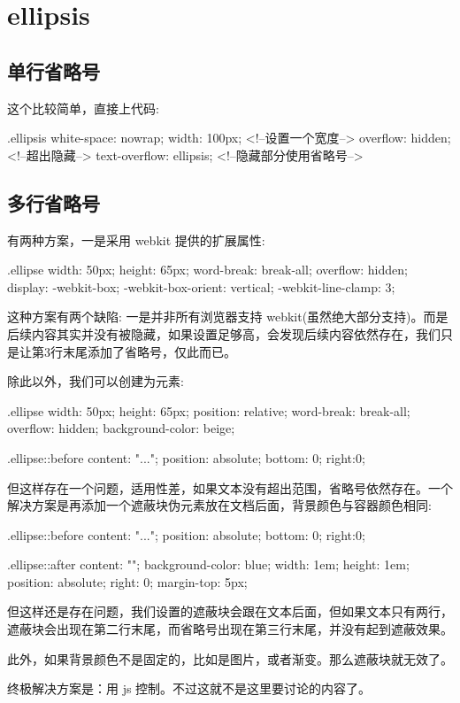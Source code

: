 \section{ellipsis}

\subsection{单行省略号}

这个比较简单，直接上代码:

\begin{HTML}
.ellipsis {
  white-space: nowrap;
  width: 100px;       <!--设置一个宽度-->
  overflow: hidden;   <!--超出隐藏-->
  text-overflow: ellipsis;  <!--隐藏部分使用省略号-->
}
\end{HTML}

\subsection{多行省略号}

有两种方案，一是采用 webkit 提供的扩展属性:

\begin{HTML}
.ellipse {
  width: 50px;
  height: 65px;
  word-break: break-all;
  overflow: hidden;
  display: -webkit-box;
  -webkit-box-orient: vertical;
  -webkit-line-clamp: 3;
}
\end{HTML}

这种方案有两个缺陷: 一是并非所有浏览器支持 webkit(虽然绝大部分支持)。而是后续内容其实并没有被隐藏，如果设置足够高，会发现后续内容依然存在，我们只是让第3行末尾添加了省略号，仅此而已。

除此以外，我们可以创建为元素:

\begin{HTML}
.ellipse {
  width: 50px;
  height: 65px;
  position: relative;
  word-break: break-all;
  overflow: hidden;
  background-color: beige;
}

.ellipse::before {
  content: "...";
  position: absolute;
  bottom: 0;
  right:0;
}
\end{HTML}

但这样存在一个问题，适用性差，如果文本没有超出范围，省略号依然存在。一个解决方案是再添加一个遮蔽块伪元素放在文档后面，背景颜色与容器颜色相同:

\begin{HTML}
.ellipse::before {
  content: "...";
  position: absolute;
  bottom: 0;
  right:0;
}

.ellipse::after {
  content: "";
  background-color: blue;
  width: 1em;
  height: 1em;
  position: absolute;
  right: 0;
  margin-top: 5px;
}
\end{HTML}

但这样还是存在问题，我们设置的遮蔽块会跟在文本后面，但如果文本只有两行，遮蔽块会出现在第二行末尾，而省略号出现在第三行末尾，并没有起到遮蔽效果。

此外，如果背景颜色不是固定的，比如是图片，或者渐变。那么遮蔽块就无效了。

终极解决方案是：用 js 控制。不过这就不是这里要讨论的内容了。